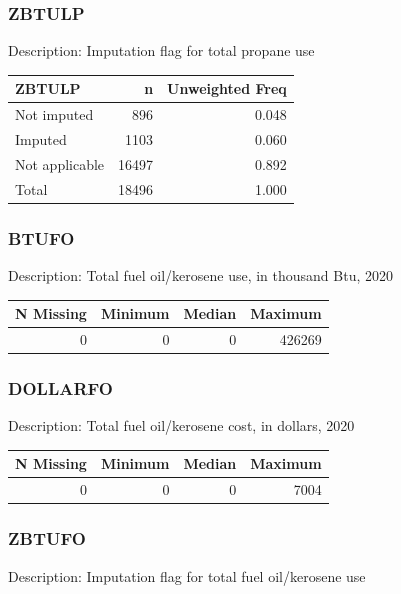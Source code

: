 \documentclass[
]{krantz}
\begin{document}
\hypertarget{zbtulp}{%
\subsubsection*{ZBTULP}\label{zbtulp}}


Description: Imputation flag for total propane use

\begin{tabular}[t]{l|r|r}
\hline
ZBTULP & n & Unweighted Freq\\
\hline
Not imputed & 896 & 0.048\\
\hline
Imputed & 1103 & 0.060\\
\hline
Not applicable & 16497 & 0.892\\
\hline
Total & 18496 & 1.000\\
\hline
\end{tabular}

\hypertarget{btufo}{%
\subsubsection*{BTUFO}\label{btufo}}


Description: Total fuel oil/kerosene use, in thousand Btu, 2020

\begin{tabular}[t]{r|r|r|r}
\hline
N Missing & Minimum & Median & Maximum\\
\hline
0 & 0 & 0 & 426269\\
\hline
\end{tabular}

\hypertarget{dollarfo}{%
\subsubsection*{DOLLARFO}\label{dollarfo}}


Description: Total fuel oil/kerosene cost, in dollars, 2020

\begin{tabular}[t]{r|r|r|r}
\hline
N Missing & Minimum & Median & Maximum\\
\hline
0 & 0 & 0 & 7004\\
\hline
\end{tabular}

\hypertarget{zbtufo}{%
\subsubsection*{ZBTUFO}\label{zbtufo}}


Description: Imputation flag for total fuel oil/kerosene use
\end{document}
